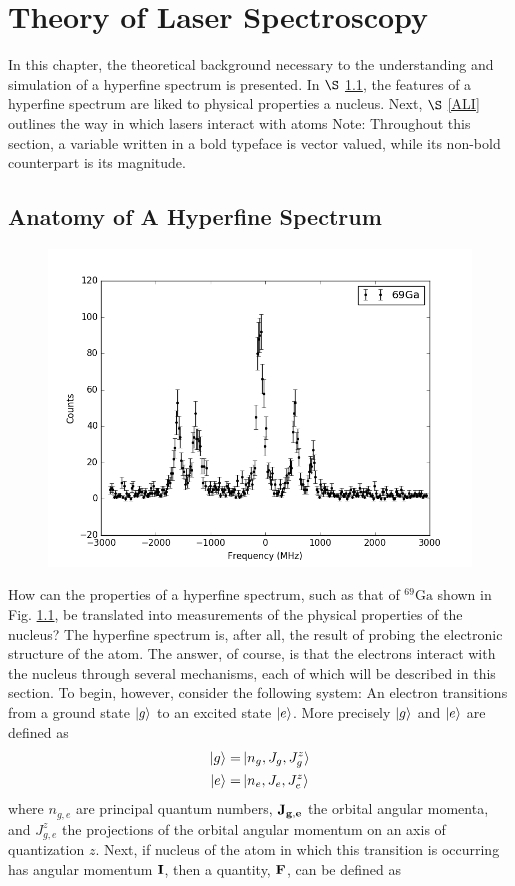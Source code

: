 \documentclass[12pt,a4paper,margin=1in]{report}
\begin{document}
\chapter{Theory of Laser Spectroscopy}
In this chapter, the theoretical background necessary to the understanding and simulation of a hyperfine spectrum is presented. In $\S$ \ref{AHF}, the features of a hyperfine spectrum are liked to physical properties a nucleus. Next, $\S$ \ref{ALI} outlines the way in which lasers interact with atoms
Note: Throughout this section, a variable written in a bold typeface is vector valued, while its non-bold counterpart is its magnitude. 
\section{Anatomy of A Hyperfine Spectrum}
\label{AHF}
\begin{figure}[h]
\includegraphics[width=\textwidth]{Graphics/ga69.png}
\label{ga69}
\end{figure}
How can the properties of a hyperfine spectrum, such as that of $^{69}\mathrm{Ga}$ shown in Fig. \ref{ga69}, be translated into measurements of the physical properties of the nucleus? The hyperfine spectrum is, after all, the result of probing the electronic structure of the atom. The answer, of course, is that the electrons interact with the nucleus through several mechanisms, each of which will be described in this section. To begin, however, consider the following system: An electron transitions from a ground state $\ket{g}$ to an excited state $\ket{e}$. More precisely $\ket{g}$ and $\ket{e}$ are defined as 
\begin{align}
\ket{g} =& \ket{n_g,J_g,J_g^z}\\
\ket{e} =& \ket{n_e,J_e,J_e^z}
\end{align}
where $n_{g,e}$ are principal quantum numbers, $\bf{J_{g,e}}$ the orbital angular momenta, and $J_{g,e}^z$ the projections of the orbital angular momentum on an axis of quantization $z$. Next, if nucleus of the atom in which this transition is occurring has angular momentum $\bf{I}$, then a quantity, $\bf{F}$, can be defined as 
\end{document}
